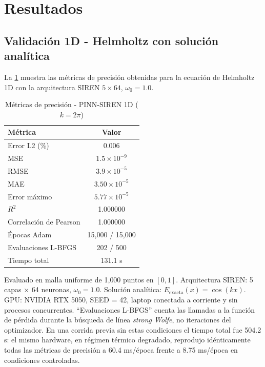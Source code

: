 
\section{Resultados}
\label{sec:resultados}

\subsection{Validación 1D - Helmholtz con solución analítica}
\label{subsec:resultados1d}

La \cref{tab:resultados1d} muestra las métricas de precisión obtenidas para la
ecuación de Helmholtz 1D con la arquitectura SIREN $5\times64$, $\omega_0 = 1.0$.

\begin{table}[htbp]
\centering
\begin{threeparttable}
\caption{Métricas de precisión - PINN-SIREN 1D ($k = 2\pi$)}
\label{tab:resultados1d}
\begin{tabular}{lc}
\toprule
Métrica & Valor \\
\midrule
Error L2 (\%)          & 0.006 \\
MSE                    & $1.5 \times 10^{-9}$ \\
RMSE                   & $3.9 \times 10^{-5}$ \\
MAE                    & $3.50 \times 10^{-5}$ \\
Error máximo           & $5.77 \times 10^{-5}$ \\
$R^2$                  & 1.000000 \\
Correlación de Pearson & 1.000000 \\
\midrule
Épocas Adam            & 15{,}000 / 15{,}000 \\
Evaluaciones L-BFGS    & 202 / 500 \\
Tiempo total           & 131.1 s \\
\bottomrule
\end{tabular}
\begin{tablenotes}
\small
\item Evaluado en malla uniforme de 1{,}000 puntos en $[0,1]$.
      Arquitectura SIREN: 5 capas $\times$ 64 neuronas, $\omega_0 = 1.0$.
      Solución analítica: $E_{\mathrm{exacta}}(x) = \cos(kx)$.
      GPU: NVIDIA RTX 5050, SEED = 42, laptop conectada a corriente y sin
      procesos concurrentes. ``Evaluaciones L-BFGS'' cuenta las llamadas a
      la función de pérdida durante la búsqueda de línea \textit{strong
      Wolfe}, no iteraciones del optimizador. En una corrida previa sin
      estas condiciones el tiempo total fue 504.2 s: el mismo hardware, en
      régimen térmico degradado, reprodujo idénticamente todas las
      métricas de precisión a 60.4 ms/época frente a 8.75 ms/época en
      condiciones controladas.
\end{tablenotes}
\end{threeparttable}
\end{table}

